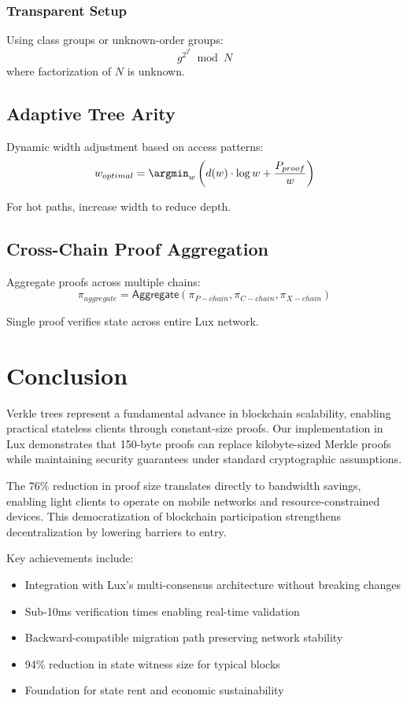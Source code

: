 \documentclass[11pt,a4paper]{article}
\theoremstyle{definition}
\begin{document}
\subsubsection{Transparent Setup}
Using class groups or unknown-order groups:
\begin{equation}
    g^{2^{2^t}} \bmod N
\end{equation}
where factorization of $N$ is unknown.

\subsection{Adaptive Tree Arity}

Dynamic width adjustment based on access patterns:
\begin{equation}
    w_{optimal} = \argmin_{w} \left( d(w) \cdot \log w + \frac{P_{proof}}{w} \right)
\end{equation}

For hot paths, increase width to reduce depth.

\subsection{Cross-Chain Proof Aggregation}

Aggregate proofs across multiple chains:
\begin{equation}
    \pi_{aggregate} = \mathsf{Aggregate}(\pi_{P-chain}, \pi_{C-chain}, \pi_{X-chain})
\end{equation}

Single proof verifies state across entire Lux network.

\section{Conclusion}

Verkle trees represent a fundamental advance in blockchain scalability, enabling practical stateless clients through constant-size proofs. Our implementation in Lux demonstrates that 150-byte proofs can replace kilobyte-sized Merkle proofs while maintaining security guarantees under standard cryptographic assumptions.

The 76\% reduction in proof size translates directly to bandwidth savings, enabling light clients to operate on mobile networks and resource-constrained devices. This democratization of blockchain participation strengthens decentralization by lowering barriers to entry.

Key achievements include:
\begin{itemize}
    \item Integration with Lux's multi-consensus architecture without breaking changes
    \item Sub-10ms verification times enabling real-time validation
    \item Backward-compatible migration path preserving network stability
    \item 94\% reduction in state witness size for typical blocks
    \item Foundation for state rent and economic sustainability
\end{itemize}
\end{document}
